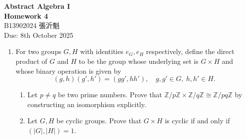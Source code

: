 \documentclass[12pt]{article}
\begin{document}
\begin{center}
    \Large\textbf{Abstract Algebra I} \\[4pt]
    \large\textbf{Homework 4} \\[4pt] 
    \normalsize B13902024 張沂魁 \\
    \normalsize Due: 8th October 2025
\end{center}

\bigskip

\begin{enumerate}
    \item For two groups \( G, H \) with identities \( e_G, e_H \) respectively, define the direct product of \( G \) and \( H \) to be the group whose underlying set is \( G \times H \) and whose binary operation is given by
    \[
        (g, h)(g', h') = (gg', hh'), \quad g, g' \in G, \ h, h' \in H.
    \]

    \begin{enumerate}[label=(\alph*)]
        \item Let \( p \neq q \) be two prime numbers. Prove that \( \mathbb{Z}/p\mathbb{Z} \times \mathbb{Z}/q\mathbb{Z} \cong \mathbb{Z}/pq\mathbb{Z} \) by constructing an isomorphism explicitly.

        \item Let \( G, H \) be cyclic groups. Prove that \( G \times H \) is cyclic if and only if \( (|G|, |H|) = 1 \).


\end{enumerate}
\end{enumerate}
\end{document}
